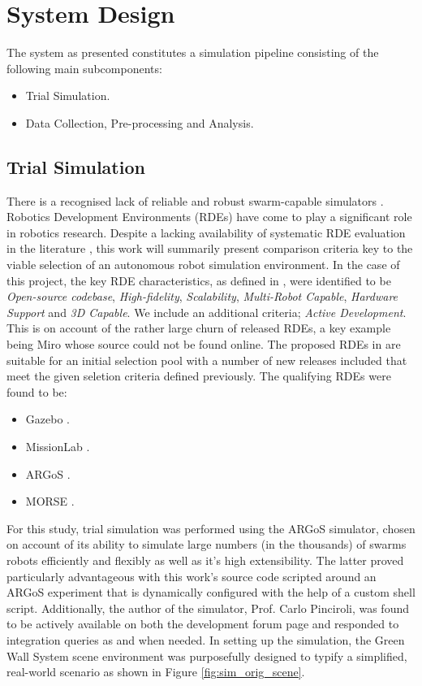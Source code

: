 \documentclass{report}
\begin{document}
\newpage

\section{System Design} \label{system_design}
The system as presented constitutes a simulation pipeline consisting of the following main subcomponents:
\begin{itemize}
	\item Trial Simulation.
	\item Data Collection, Pre-processing and Analysis.
\end{itemize}

\subsection{Trial Simulation}
There is a recognised lack of reliable and robust swarm-capable simulators \cite{Noronha2016}. Robotics Development Environments (RDEs) have come to play a significant role in robotics research. Despite a lacking availability of systematic RDE evaluation in the literature \cite{Kramer2007}, this work will summarily present comparison criteria key to the viable selection of an autonomous robot simulation environment. In the case of this project, the key RDE characteristics, as defined in \cite{Kramer2007}, were identified to be \textit{Open-source codebase}, \textit{High-fidelity}, \textit{Scalability}, \textit{Multi-Robot Capable}, \textit{Hardware Support} and \textit{3D Capable}. We include an additional criteria; \textit{Active Development}. This is on account of the rather large churn of released RDEs, a key example being Miro \cite{Enderle2001} whose source could not be found online. The proposed RDEs in \cite{Kramer2007} are suitable for an initial selection pool with a number of new releases included that meet the given seletion criteria defined previously. The qualifying RDEs were found to be:
\begin{itemize}
	\item Gazebo \cite{Koenig2004}.
	\item MissionLab \cite{MISSIONLAB}.
	\item ARGoS \cite{Pinciroli2011}.
	\item MORSE \cite{Morse2011}.
\end{itemize}

For this study, trial simulation was performed using the ARGoS simulator, chosen on account of its ability to simulate large numbers (in the thousands) of swarms robots efficiently and flexibly \cite{Pinciroli2014} as well as it's high extensibility. The latter proved particularly advantageous with this work's source code scripted around an ARGoS experiment that is dynamically configured with the help of a custom shell script. Additionally, the author of the simulator, Prof. Carlo Pinciroli, was found to be actively available on both the development forum page and responded to integration queries as and when needed. In setting up the simulation, the Green Wall System scene environment was purposefully designed to typify a simplified, real-world scenario as shown in Figure \ref{fig:sim_orig_scene}.
\end{document}
